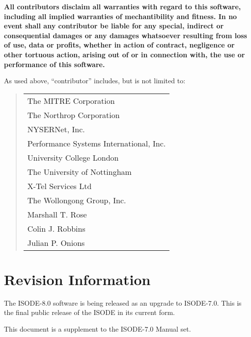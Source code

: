\vskip 0.15in
\noindent
\begin{small}
{\bf All contributors disclaim all warranties with regard to this
software, including all implied warranties of me\-chan\-ti\-bil\-ity
and fitness. In no event shall any contributor be liable for any
special, indirect or consequential damages or any damages whatsoever
resulting from loss of use, data or profits, whether in action of
contract, ne\-gli\-gence or other tortuous action, arising out of or
in connection with, the use or performance of this software.}
\end{small}

\vskip 0.15in
\noindent
As used above,
``contributor'' includes, but is not limited to:
\begin{quote}
\begin{tabular}{l}
The MITRE Corporation\\
The Northrop Corporation\\
NYSERNet, Inc.\\
Performance Systems International, Inc.\\
University College London\\
The University of Nottingham\\
X-Tel Services Ltd\\
The Wollongong Group, Inc.\\
Marshall T. Rose\\
Colin J. Robbins\\
Julian P. Onions
\end{tabular}
\end{quote}

\newpage\section* {Revision Information}

The ISODE-8.0 software is being released as an upgrade to ISODE-7.0.  
This is the final public release of the ISODE in its current form.

This document is a supplement to the ISODE-7.0 Manual set.


